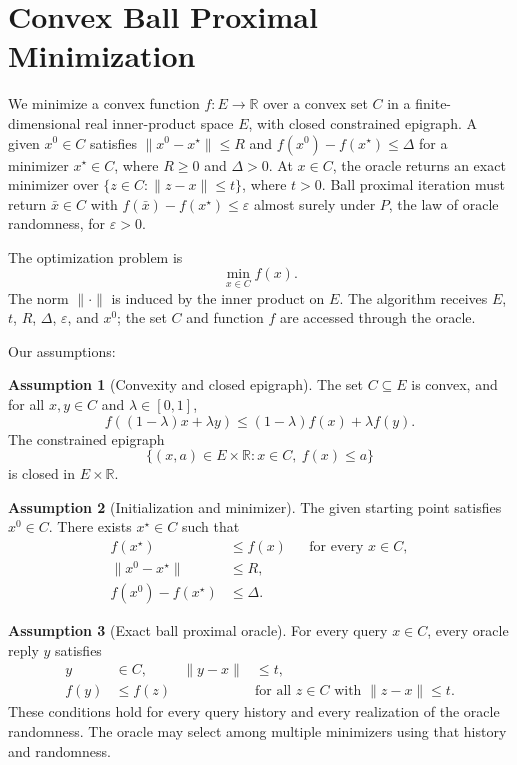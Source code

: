 \documentclass[10pt]{article}
\theoremstyle{definition}
\newtheorem{assumption}{Assumption}
\begin{document}
\section*{Convex Ball Proximal Minimization}
We minimize a convex function $f:E\to\mathbb{R}$ over a convex set $C$ in a finite-dimensional real inner-product space $E$, with closed constrained epigraph. A given $x^0\in C$ satisfies $\|x^0-x^\star\|\leq R$ and $f(x^0)-f(x^\star)\leq\Delta$ for a minimizer $x^\star\in C$, where $R\geq0$ and $\Delta>0$. At $x\in C$, the oracle returns an exact minimizer over $\{z\in C:\|z-x\|\leq t\}$, where $t>0$. Ball proximal iteration must return $\bar{x}\in C$ with $f(\bar{x})-f(x^\star)\leq\varepsilon$ almost surely under $P$, the law of oracle randomness, for $\varepsilon>0$.

The optimization problem is
\[
\min_{x\in C} f(x).
\]
The norm $\|\cdot\|$ is induced by the inner product on $E$. The algorithm receives $E$, $t$, $R$, $\Delta$, $\varepsilon$, and $x^0$; the set $C$ and function $f$ are accessed through the oracle.

Our assumptions:
\begin{assumption}[Convexity and closed epigraph]
The set $C\subseteq E$ is convex, and for all $x,y\in C$ and $\lambda\in[0,1]$,
\[
f((1-\lambda)x+\lambda y)
\leq (1-\lambda)f(x)+\lambda f(y).
\]
The constrained epigraph
\[
\{(x,a)\in E\times\mathbb{R}:x\in C,\ f(x)\leq a\}
\]
is closed in $E\times\mathbb{R}$.
\end{assumption}

\begin{assumption}[Initialization and minimizer]
The given starting point satisfies $x^0\in C$. There exists $x^\star\in C$ such that
\[
\begin{aligned}
f(x^\star)&\leq f(x) &&\text{for every }x\in C,\\
\|x^0-x^\star\|&\leq R,\\
f(x^0)-f(x^\star)&\leq\Delta.
\end{aligned}
\]
\end{assumption}

\begin{assumption}[Exact ball proximal oracle]
For every query $x\in C$, every oracle reply $y$ satisfies
\[
\begin{aligned}
y&\in C, & \|y-x\|&\leq t,\\
f(y)&\leq f(z)
&&\text{for all }z\in C\text{ with }\|z-x\|\leq t.
\end{aligned}
\]
These conditions hold for every query history and every realization of the oracle randomness. The oracle may select among multiple minimizers using that history and randomness.
\end{assumption}
\end{document}
